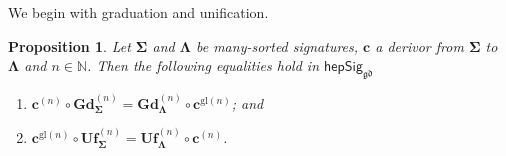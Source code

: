 \documentclass[a4paper, reqno
]{amsart}
\newcommand{\sig}[1]{\mathbf{#1}}             %
\newcommand{\gd}{\mathfrak{gd}}              %
\newcommand{\gl}{\mathrm{gl}}                %
\newcommand{\bGd}{\mathbf{Gd}}
\newcommand{\bUf}{\mathbf{Uf}}
\theoremstyle{plain}
\newtheorem{proposition}[theorem]{Proposition}
\theoremstyle{definition}
\begin{document}
We begin with graduation and unification.

\begin{proposition}\label{PChangeSigGdUf}
Let $\sig{\Sigma}$ and $\sig{\Lambda}$ be many-sorted signatures, $\mathbf{c}$ a derivor from $\sig{\Sigma}$ to $\sig{\Lambda}$ and $n\in\mathbb{N}$.
Then the following equalities hold in $\mathsf{hepSig}_{\gd}$
\begin{enumerate}
	\item
	$\mathbf{c}^{(n)}\circ\bGd^{(n)}_{\sig{\Sigma}}=\bGd^{(n)}_{\sig{\Lambda}}\circ\mathbf{c}^{\gl(n)}$; and

	\item
	$\mathbf{c}^{\gl(n)}\circ\bUf^{(n)}_{\sig{\Sigma}}=\bUf^{(n)}_{\sig{\Lambda}}\circ\mathbf{c}^{(n)}$.
\end{enumerate}
\end{proposition}
\end{document}
